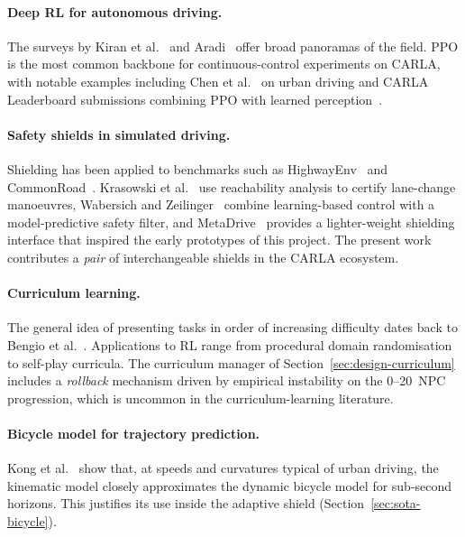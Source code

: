 \paragraph{Deep RL for autonomous driving.}
The surveys by Kiran et al.~\cite{kiran2022drlsurvey} and Aradi~\cite{aradi2022survey} offer
broad panoramas of the field. PPO is the most common backbone for continuous-control experiments
on CARLA, with notable examples including Chen et al.~\cite{chen2019carlarl} on urban driving and
CARLA Leaderboard submissions combining PPO with learned perception~\cite{chitta2023transfuser}.

\paragraph{Safety shields in simulated driving.}
Shielding has been applied to benchmarks such as HighwayEnv~\cite{leurent2018highway} and CommonRoad~\cite{althoff2017commonroad}. Krasowski et
al.~\cite{krasowski2020safe} use reachability analysis to certify lane-change manoeuvres,
Wabersich and Zeilinger~\cite{wabersich2021filter} combine learning-based control with a
model-predictive safety filter, and MetaDrive~\cite{li2023metadrive} provides a lighter-weight
shielding interface that inspired the early prototypes of this project. The present work
contributes a \emph{pair} of interchangeable shields in the CARLA ecosystem.

\paragraph{Curriculum learning.}
The general idea of presenting tasks in order of increasing difficulty dates back to Bengio et
al.~\cite{bengio2009curriculum}. Applications to RL range from procedural domain
randomisation~\cite{akkaya2019solving} to self-play curricula. The curriculum manager of
Section~\ref{sec:design-curriculum} includes a \emph{rollback} mechanism driven by empirical
instability on the 0--20~NPC progression, which is uncommon in the curriculum-learning
literature.

\paragraph{Bicycle model for trajectory prediction.}
Kong et al.~\cite{kong2015kinematic} show that, at speeds and curvatures typical of urban
driving, the kinematic model closely approximates the dynamic bicycle model for sub-second
horizons. This justifies its use inside the adaptive shield
(Section~\ref{sec:sota-bicycle}).

\clearpage
